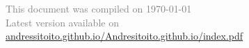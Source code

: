 \documentclass{resume} %
\begin{document}
\begin{multicols}{2}
    {\bf } 


\end{multicols}









\begin{flushright}
  \vspace{-30px}
\end{flushright} 
\textcolor{gray}{This document was compiled on \today\\ Latest version available on \href{https://andressitoito.github.io/Andresitoito.github.io/index.pdf}{andressitoito.github.io/Andresitoito.github.io/index.pdf}}
\end{document}
